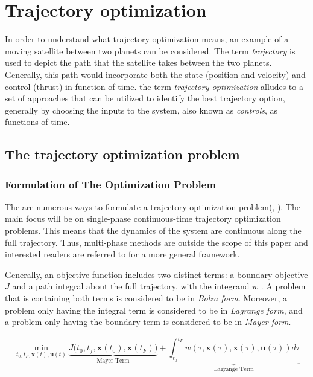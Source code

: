 \documentclass{thesisreport}
\begin{document}
 
\newpage

 \chapter{Trajectory optimization} 
  
 
 In order to understand what trajectory optimization means, an example of a moving satellite between two planets can be considered.  The term \textit{trajectory} is used to depict the path that the satellite takes between the two planets. Generally, this path would incorporate both the state (position and velocity) and control (thrust) in function of time. the term \textit{trajectory optimization} alludes to a set of  approaches that can be utilized to identify the best trajectory option, generally by choosing the inputs to the system, also known as \textit{controls}, as functions of time.   
 
 \section{The trajectory optimization problem}

\subsection{Formulation of The Optimization Problem} 
 
 The are numerous ways to formulate a trajectory optimization problem(\cite{Betts1998}, \cite{Patterson2013}  \cite{Rao2009}). The main focus will be on single-phase continuous-time trajectory optimization problems. This means that the dynamics of the system are continuous along the full trajectory. Thus, multi-phase methods are outside the scope of this paper and interested readers are referred to \cite{Rao2009} for a more general framework.
 
 
\noindent Generally, an objective function includes two distinct terms: a boundary objective $J$ and a path integral about the full trajectory, with the integrand $w$ . A problem that is containing both terms is considered to be in \textit{Bolza form}. Moreover, a problem only having the integral term is considered to be in \textit{Lagrange form}, and a problem only having the boundary term is considered to be in \textit{Mayer form}. 
 

 
 
 
 
  \begin{equation}\label{trajectory_optimization_function}
 \min\limits_{t_0,t_F,\bm{x}(t),\bm{u}(t)} \underbrace{J \big(t_0,t_f,\bm{x}(t_0),\bm{x}(t_F)\big)}_\text{Mayer Term} + \underbrace{\int_{t_0}^{t_F} w(\tau, \bm{x}(\tau),\bm{x}(\tau),\bm{u}(\tau)) d \tau}_\text{Lagrange Term}
 \end{equation}
 
\end{document}

